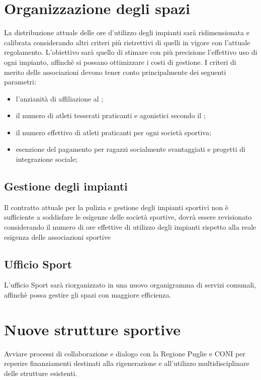 \documentclass[a4paper,14pt,italian]{sphinxmanual}
\begin{document}
\section{Organizzazione degli spazi}
\label{\detokenize{sport:organizzazione-degli-spazi}}
La distribuzione attuale delle ore d’utilizzo degli impianti sarà ridimensionata e calibrata considerando altri criteri più ristrettivi di quelli in vigore con l’attuale regolamento.
L’obiettivo sarà quello di stimare con più precisione l’effettivo uso di ogni impianto, affinchè si possano ottimizzare i costi di gestione.
I criteri di merito delle associazioni devono tener conto principalmente dei seguenti parametri:
\begin{itemize}
\item {} 
l’anzianità di affiliazione al ;

\item {} 
il numero di atleti tesserati praticanti e agonistici secondo il ;

\item {} 
il numero effettivo di atleti praticanti per ogni società sportiva;

\item {} 
esenzione del pagamento per ragazzi socialmente svantaggiati e progetti di integrazione sociale;

\end{itemize}


\subsection{Gestione degli impianti}
\label{\detokenize{sport:gestione-degli-impianti}}
Il contratto attuale per la pulizia e gestione degli impianti sportivi non è sufficiente a soddisfare le esigenze delle società sportive, dovrà essere revisionato considerando il numero di ore effettive di utilizzo degli impianti rispetto alla reale esigenza delle associazioni sportive


\subsection{Ufficio Sport}
\label{\detokenize{sport:ufficio-sport}}
L’ufficio Sport sarà riorganizzato in una nuovo organigramma di servizi comunali, affinchè possa gestire gli spazi con maggiore efficienza.


\section{Nuove strutture sportive}
\label{\detokenize{sport:nuove-strutture-sportive}}
Avviare processi di collaborazione e dialogo con la Regione Puglie e CONI per reperire finanziamenti destinati alla rigenerazione e all’utilizzo multidisciplinare delle strutture esistenti.
\end{document}
